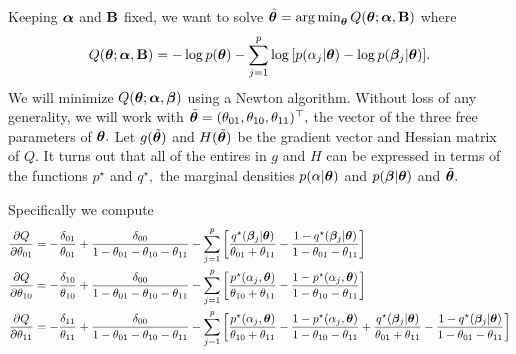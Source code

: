 Keeping $\boldsymbol{\alpha}$ and $\mathbf{B}$ fixed, we want to solve $\hat{\boldsymbol{\theta}} = \operatorname*{arg\,min}_{\boldsymbol{\theta}}Q(\boldsymbol{\theta}; \boldsymbol{\alpha}, \mathbf{B})$ where
$$
Q(\boldsymbol{\theta}; \boldsymbol{\alpha}, \mathbf{B}) = -\log{p(\boldsymbol{\theta})} - \sum_{j = 1}^{p}{\log{[p(\alpha_{j} \vert \boldsymbol{\theta})} - \log{p(\boldsymbol{\beta}_{j} \vert \boldsymbol{\theta})}]}.
$$
We will minimize $Q(\boldsymbol{\theta};\boldsymbol{\alpha}, \boldsymbol{\beta})$ using a Newton algorithm.
Without loss of any generality, we will work with $\tilde{\boldsymbol{\theta}} = (\theta_{01}, \theta_{10}, \theta_{11})^{\top},$ the vector of the three free parameters of $\boldsymbol{\theta}.$
Let $g(\tilde{\boldsymbol{\theta}})$ and $H(\tilde{\boldsymbol{\theta}})$ be the gradient vector and Hessian matrix of $Q.$
It turns out that all of the entires in $g$ and $H$ can be expressed in terms of the functions $p^{\star}$ and $q^{\star},$ the marginal densities $p(\alpha \vert \boldsymbol{\theta})$ and $p(\boldsymbol{\beta} \vert \boldsymbol{\theta})$ and $\tilde{\boldsymbol{\theta}}.$


Specifically we compute
\begin{align*}
\frac{\partial Q}{\partial \theta_{01}} &= -\frac{\delta_{01}}{\theta_{01}} + \frac{\delta_{00}}{1 - \theta_{01} - \theta_{10} - \theta_{11}} - \sum_{j = 1}^{p}{\left[\frac{q^{\star}(\boldsymbol{\beta}_{j}\vert\boldsymbol{\theta})}{\theta_{01} + \theta_{11}} - \frac{1 - q^{\star}(\boldsymbol{\beta}_{j}\vert \boldsymbol{\theta})}{1 - \theta_{01} - \theta_{11}}\right]} \\
\frac{\partial Q}{\partial \theta_{10}} &= -\frac{\delta_{10}}{\theta_{10}} + \frac{\delta_{00}}{1 - \theta_{01} - \theta_{10} - \theta_{11}} - \sum_{j = 1}^{p}{\left[\frac{p^{\star}(\alpha_{j}, \boldsymbol{\theta})}{\theta_{10} + \theta_{11}} - \frac{1 - p^{\star}(\alpha_{j}, \boldsymbol{\theta})}{1 - \theta_{10} - \theta_{11}}\right]} \\
\frac{\partial Q}{\partial \theta_{11}} &= -\frac{\delta_{11}}{\theta_{11}} + \frac{\delta_{00}}{1 - \theta_{01} - \theta_{10} - \theta_{11}} - \sum_{j = 1}^{p}{\left[\frac{p^{\star}(\alpha_{j}, \boldsymbol{\theta})}{\theta_{10} + \theta_{11}} - \frac{1 - p^{\star}(\alpha_{j}, \boldsymbol{\theta})}{1 - \theta_{10} - \theta_{11}} + \frac{q^{\star}(\boldsymbol{\beta}_{j}\vert\boldsymbol{\theta})}{\theta_{01} + \theta_{11}} - \frac{1 - q^{\star}(\boldsymbol{\beta}_{j}\vert \boldsymbol{\theta})}{1 - \theta_{01} - \theta_{11}}\right]}
\end{align*}


